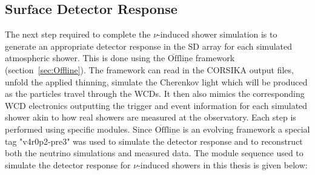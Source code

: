 \subsection{Surface Detector Response}
\label{subsec:sim_SD_resp}

The next step required to complete the $\nu$-induced shower simulation is to generate an appropriate detector response in the SD array for each simulated atmospheric shower. This is done using the $\mathrm{\overline{Off}\underline{line}}$ framework (section~\ref{sec:Offline}). The framework can read in the CORSIKA output files, unfold the applied thinning, simulate the Cherenkov light which will be produced as the particles travel through the WCDs. It then also mimics the corresponding WCD electronics outputting the trigger and event information for each simulated shower akin to how real showers are measured at the observatory. Each step is performed using specific modules. Since $\mathrm{\overline{Off}\underline{line}}$ is an evolving framework a special tag "v4r0p2-pre3" was used to simulate the detector response and to reconstruct both the neutrino simulations and measured data. The module sequence used to simulate the detector response for $\nu$-induced showers in this thesis is given below: 


